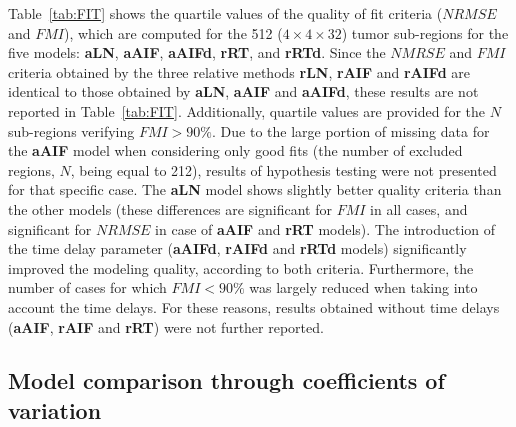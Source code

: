 Table~\ref{tab:FIT} shows the quartile values of the quality of fit criteria ($NRMSE$ and $FMI$), which are computed for the 512 ($4\times 4\times 32$) tumor sub-regions for the five models: \textbf{aLN}, \textbf{aAIF}, \textbf{aAIFd}, \textbf{rRT}, and \textbf{rRTd}.
Since the $NMRSE$ and $FMI$ criteria obtained by the three relative methods \textbf{rLN}, \textbf{rAIF} and \textbf{rAIFd} are identical to those obtained by \textbf{aLN}, \textbf{aAIF} and \textbf{aAIFd}, these results are not reported in Table~\ref{tab:FIT}. Additionally, quartile values are provided for the $N$ sub-regions verifying $FMI > 90\%$. 
Due to the large portion of missing data for the \textbf{aAIF} model when considering only good fits (the number of excluded regions, $N$, being equal to 212), results of hypothesis testing were not presented for that specific case. 
The \textbf{aLN} model shows slightly better quality criteria than the other models (these differences are significant for $FMI$ in all cases, and significant for $NRMSE$ in case of \textbf{aAIF} and \textbf{rRT} models). The introduction of the time delay parameter (\textbf{aAIFd},  \textbf{rAIFd} and \textbf{rRTd} models) significantly improved the modeling quality, according to both criteria. Furthermore, the number of cases for which $FMI <90\%$ was largely reduced when taking into account the time delays. For these reasons, results obtained without time delays (\textbf{aAIF}, \textbf{rAIF} and \textbf{rRT}) were not further reported.

\subsection{Model comparison through coefficients of variation}

